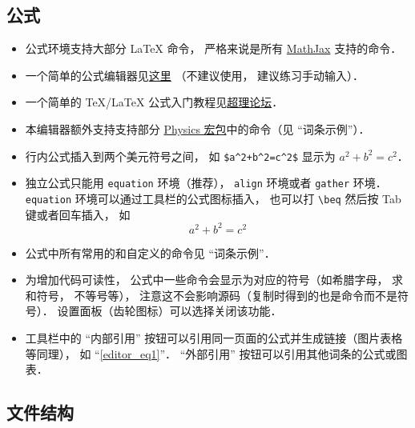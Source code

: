 \subsection{公式}
\begin{itemize}
\item 公式环境支持大部分 LaTeX 命令， 严格来说是所有 \href{https://www.mathjax.org/}{MathJax} 支持的命令．
\item 一个简单的公式编辑器见\href{https://www.codecogs.com/latex/eqneditor.php}{这里} （不建议使用， 建议练习手动输入）．
\item 一个简单的 TeX/LaTeX 公式入门教程见\href{https://chaoli.club/index.php/211}{超理论坛}．
\item 本编辑器额外支持支持部分 \href{http://mirrors.ibiblio.org/CTAN/macros/latex/contrib/physics/physics.pdf}{Physics 宏包}中的命令（见 “词条示例”）．
\item 行内公式插入到两个美元符号之间， 如 \verb|$a^2+b^2=c^2$| 显示为 $a^2 + b^2 = c^2$．
\item 独立公式只能用 \verb|equation| 环境（推荐）， \verb|align| 环境或者 \verb|gather| 环境． \verb|equation| 环境可以通过工具栏的公式图标插入， 也可以打 \verb|\beq| 然后按 Tab 键或者回车插入， 如
\begin{equation}\label{editor_eq1}
a^2 + b^2 = c^2
\end{equation}
\item 公式中所有常用的和自定义的命令见 “词条示例”．
\item 为增加代码可读性， 公式中一些命令会显示为对应的符号（如希腊字母， 求和符号， 不等号等）， 注意这不会影响源码（复制时得到的也是命令而不是符号）． 设置面板（齿轮图标）可以选择关闭该功能．
\item 工具栏中的 “内部引用” 按钮可以引用同一页面的公式并生成链接（图片表格等同理）， 如 “\autoref{editor_eq1}”． “外部引用” 按钮可以引用其他词条的公式或图表．
\end{itemize}

\subsection{文件结构}

